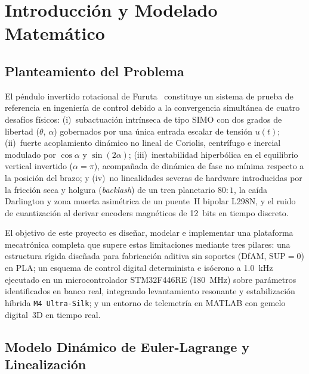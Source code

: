 \section{Introducción y Modelado Matemático}
\label{sec:introduccion}

\subsection{Planteamiento del Problema}
El péndulo invertido rotacional de Furuta~\cite{furuta1991,cazzolato2011} constituye un sistema de prueba de referencia en ingeniería de control debido a la convergencia simultánea de cuatro desafíos físicos: (i)~subactuación intrínseca de tipo SIMO con dos grados de libertad ($\theta$, $\alpha$) gobernados por una única entrada escalar de tensión $u(t)$; (ii)~fuerte acoplamiento dinámico no lineal de Coriolis, centrífugo e inercial modulado por $\cos\alpha$ y $\sin(2\alpha)$; (iii)~inestabilidad hiperbólica en el equilibrio vertical invertido ($\alpha = \pi$), acompañada de dinámica de fase no mínima respecto a la posición del brazo; y (iv)~no linealidades severas de hardware introducidas por la fricción seca y holgura (\textit{backlash}) de un tren planetario $80:1$, la caída Darlington y zona muerta asimétrica de un puente~H bipolar L298N, y el ruido de cuantización al derivar encoders magnéticos de 12~bits en tiempo discreto.

El objetivo de este proyecto es diseñar, modelar e implementar una plataforma mecatrónica completa que supere estas limitaciones mediante tres pilares: una estructura rígida diseñada para fabricación aditiva sin soportes (DfAM, $\text{SUP}=0$) en PLA; un esquema de control digital determinista e isócrono a \qty{1.0}{\kilo\hertz} ejecutado en un microcontrolador STM32F446RE (\qty{180}{\mega\hertz}) sobre parámetros identificados en banco real, integrando levantamiento resonante y estabilización híbrida \texttt{M4 Ultra-Silk}; y un entorno de telemetría en MATLAB con gemelo digital~3D en tiempo real.

\subsection{Modelo Dinámico de Euler-Lagrange y Linealización}
\label{subsec:euler_lagrange}

